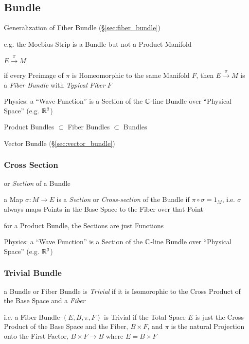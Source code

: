 \subsection{Bundle}\label{sec:bundle}

Generalization of Fiber Bundle (\S\ref{sec:fiber_bundle})

e.g. the Moebius Strip is a Bundle but not a Product Manifold

$E \xrightarrow{\pi} M$

if every Preimage of $\pi$ is Homeomorphic to the same Manifold $F$, then $E
\xrightarrow{\pi} M$ is a \emph{Fiber Bundle} with \emph{Typical Fiber} $F$

Physics: a ``Wave Function'' is a Section of the $\mathbb{C}$-line Bundle over
``Physical Space'' (e.g. $\mathbb{R}^3$)

Product Bundles $\subset$ Fiber Bundles $\subset$ Bundles

Vector Bundle (\S\ref{sec:vector_bundle})




\subsubsection{Cross Section}\label{sec:cross_section}

or \emph{Section} of a Bundle

a Map $\sigma : M \rightarrow E$ is a \emph{Section} or \emph{Cross-section} of
the Bundle if $\pi \circ \sigma = 1_M$, i.e. $\sigma$ always maps Points in the
Base Space to the Fiber over that Point

for a Product Bundle, the Sections are just Functions

Physics: a ``Wave Function'' is a Section of the $\mathbb{C}$-line Bundle over
``Physical Space'' (e.g. $\mathbb{R}^3$)



\subsubsection{Trivial Bundle}\label{sec:trivial_bundle}

a Bundle or Fiber Bundle is \emph{Trivial} if it is Isomorophic to the Cross
Product of the Base Space and a \emph{Fiber}

i.e. a Fiber Bundle $(E, B, \pi, F)$ is Trivial if the Total Space $E$ is just
the Cross Product of the Base Space and the Fiber, $B \times F$, and $\pi$ is
the natural Projection onto the First Factor, $B \times F \rightarrow B$ where
$E = B \times F$


